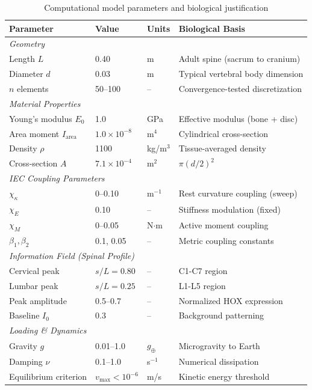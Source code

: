 \documentclass[11pt,a4paper]{article}
\begin{document}
\begin{table}[h!]
\centering
\caption{Computational model parameters and biological justification}
\label{tab:parameters}
\small
\begin{tabular}{llll}
\toprule
\textbf{Parameter} & \textbf{Value} & \textbf{Units} & \textbf{Biological Basis} \\
\midrule
\multicolumn{4}{l}{\textit{Geometry}} \\
Length $L$ & 0.40 & m & Adult spine (sacrum to cranium) \\
Diameter $d$ & 0.03 & m & Typical vertebral body dimension \\
$n$ elements & 50--100 & -- & Convergence-tested discretization \\
\midrule
\multicolumn{4}{l}{\textit{Material Properties}} \\
Young's modulus $E_0$ & 1.0 & GPa & Effective modulus (bone + disc) \\
Area moment $I_{\mathrm{area}}$ & $1.0 \times 10^{-8}$ & m$^4$ & Cylindrical cross-section \\
Density $\rho$ & 1100 & kg/m$^3$ & Tissue-averaged density \\
Cross-section $A$ & $7.1 \times 10^{-4}$ & m$^2$ & $\pi (d/2)^2$ \\
\midrule
\multicolumn{4}{l}{\textit{IEC Coupling Parameters}} \\
$\chi_\kappa$ & 0--0.10 & m$^{-1}$ & Rest curvature coupling (sweep) \\
$\chi_E$ & 0.10 & -- & Stiffness modulation (fixed) \\
$\chi_M$ & 0--0.05 & N$\cdot$m & Active moment coupling \\
$\beta_1, \beta_2$ & 0.1, 0.05 & -- & Metric coupling constants \\
\midrule
\multicolumn{4}{l}{\textit{Information Field (Spinal Profile)}} \\
Cervical peak & $s/L = 0.80$ & -- & C1-C7 region \\
Lumbar peak & $s/L = 0.25$ & -- & L1-L5 region \\
Peak amplitude & 0.5--0.7 & -- & Normalized HOX expression \\
Baseline $I_0$ & 0.3 & -- & Background patterning \\
\midrule
\multicolumn{4}{l}{\textit{Loading \& Dynamics}} \\
Gravity $g$ & 0.01--1.0 & $g_\oplus$ & Microgravity to Earth \\
Damping $\nu$ & 0.1--1.0 & s$^{-1}$ & Numerical dissipation \\
Equilibrium criterion & $v_{\max} < 10^{-6}$ & m/s & Kinetic energy threshold \\
\bottomrule
\end{tabular}
\end{table}
\end{document}
